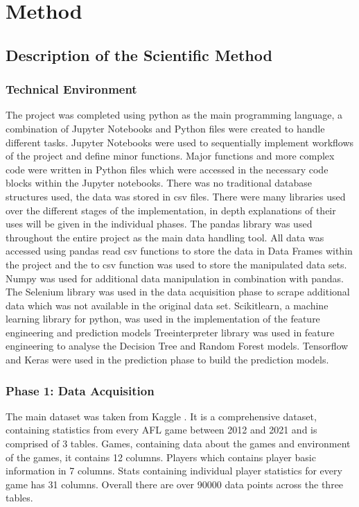\documentclass{imc-inf}
\begin{document}
	
	\chapter{Method}\label{chap:method}
	\section{Description of the Scientific Method }
	
	\subsection{Technical Environment}
	The project was completed using python as the main programming language, a combination of Jupyter Notebooks and Python files were created to handle different tasks. Jupyter Notebooks were used to sequentially implement workflows of the project and define minor functions. Major functions and more complex code were written in Python files which were accessed in the necessary code blocks within the Jupyter notebooks. There was no traditional database structures used, the data was stored in csv files. 
	There were many libraries used over the different stages of the implementation, in depth explanations of their uses will be given in the individual phases. The pandas library was used throughout the entire project as the main data handling tool. All data was accessed using pandas read csv functions to store the data in Data Frames within the project and the to csv function was used to store the manipulated data sets.
	Numpy was used for additional data manipulation in combination with pandas.  
	The Selenium library was used in the data acquisition phase to scrape additional data which was not available in the original data set.
	Scikitlearn, a machine learning library for python, was used in the implementation of the feature engineering and prediction models
	Treeinterpreter library was used in feature engineering to analyse the Decision Tree and Random Forest models.
	Tensorflow and Keras were used in the prediction phase to build the prediction models.
	
	\subsection{Phase 1: Data Acquisition}
	The main dataset was taken from Kaggle \cite{stone}. It is a comprehensive dataset, containing statistics from every AFL game between 2012 and 2021 and is comprised of 3 tables. Games, containing data about the games and environment of the games, it contains 12 columns. Players which contains player basic information in 7 columns. Stats containing individual player statistics for every game has 31 columns. Overall there are over 90000 data points across the three tables.
	
\end{document}
